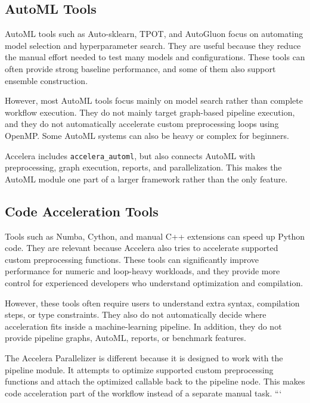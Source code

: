 \documentclass[12pt,a4paper]{report}
\begin{document}
\subsection{AutoML Tools}

AutoML tools such as Auto-sklearn, TPOT, and AutoGluon focus on automating model
selection and hyperparameter search. They are useful because they reduce the
manual effort needed to test many models and configurations. These tools can
often provide strong baseline performance, and some of them also support
ensemble construction.

\medskip
\noindent However, most AutoML tools focus mainly on model search rather than complete
workflow execution. They do not mainly target graph-based pipeline execution,
and they do not automatically accelerate custom preprocessing loops using
OpenMP. Some AutoML systems can also be heavy or complex for beginners.

\medskip
\noindent Accelera includes \texttt{accelera\_automl}, but also connects AutoML with
preprocessing, graph execution, reports, and parallelization. This makes the
AutoML module one part of a larger framework rather than the only feature.


\subsection{Code Acceleration Tools}

Tools such as Numba, Cython, and manual C++ extensions can speed up Python code.
They are relevant because Accelera also tries to accelerate supported custom
preprocessing functions. These tools can significantly improve performance for
numeric and loop-heavy workloads, and they provide more control for experienced
developers who understand optimization and compilation.

\medskip
\noindent However, these tools often require users to understand extra syntax,
compilation steps, or type constraints. They also do not automatically decide
where acceleration fits inside a machine-learning pipeline. In addition, they do
not provide pipeline graphs, AutoML, reports, or benchmark features.

\medskip
\noindent The Accelera Parallelizer is different because it is designed to work with the
pipeline module. It attempts to optimize supported custom preprocessing
functions and attach the optimized callable back to the pipeline node. This makes
code acceleration part of the workflow instead of a separate manual task.
```
\end{document}
